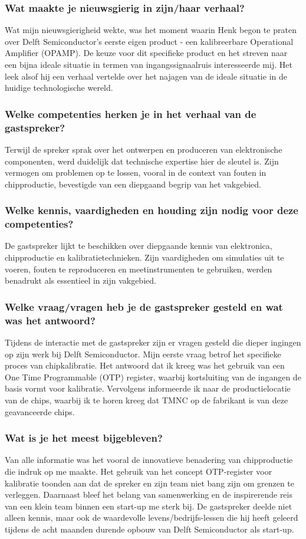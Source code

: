 \subsubsection{Wat maakte je nieuwsgierig in zijn/haar verhaal?}
Wat mijn nieuwsgierigheid wekte, was het moment waarin Henk begon te praten over Delft Semiconductor's eerste eigen product - een kalibreerbare Operational Amplifier (OPAMP). De keuze voor dit specifieke product en het streven naar een bijna ideale situatie in termen van ingangssignaalruis interesseerde mij. Het leek alsof hij een verhaal vertelde over het najagen van de ideale situatie in de huidige technologische wereld.

\subsubsection{Welke competenties herken je in het verhaal van de gastspreker?}
Terwijl de spreker sprak over het ontwerpen en produceren van elektronische componenten, werd duidelijk dat technische expertise hier de sleutel is. Zijn vermogen om problemen op te lossen, vooral in de context van fouten in chipproductie, bevestigde van een diepgaand begrip van het vakgebied.

\subsubsection{Welke kennis, vaardigheden en houding zijn nodig voor deze competenties?}
De gastspreker lijkt te beschikken over diepgaande kennis van elektronica, chipproductie en kalibratietechnieken. Zijn vaardigheden om simulaties uit te voeren, fouten te reproduceren en meetinstrumenten te gebruiken, werden benadrukt als essentieel in zijn vakgebied.

\subsubsection{Welke vraag/vragen heb je de gastspreker gesteld en wat was het antwoord?}
Tijdens de interactie met de gastspreker zijn er vragen gesteld die dieper ingingen op zijn werk bij Delft Semiconductor. Mijn eerste vraag betrof het specifieke proces van chipkalibratie. Het antwoord dat ik kreeg was het gebruik van een One Time Programmable (OTP) register, waarbij kortsluiting van de ingangen de basis vormt voor kalibratie. Vervolgens informeerde ik naar de productielocatie van de chips, waarbij ik te horen kreeg dat TMNC op de fabrikant is van deze geavanceerde chips. 


\subsubsection{Wat is je het meest bijgebleven?}
Van alle informatie was het vooral de innovatieve benadering van chipproductie die indruk op me maakte. Het gebruik van het concept OTP-register voor kalibratie toonden aan dat de spreker en zijn team niet bang zijn om grenzen te verleggen. Daarnaast bleef het belang van samenwerking en de inspirerende reis van een klein team binnen een start-up me sterk bij. De gastspreker deelde niet alleen kennis, maar ook de waardevolle levens/bedrijfs-lessen die hij heeft geleerd tijdens de acht maanden durende opbouw van Delft Semiconductor als start-up.
